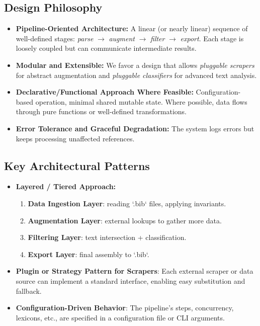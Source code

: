 \documentclass[12pt]{article}
\begin{document}
\subsection{Design Philosophy}
\begin{itemize}
  \item \textbf{Pipeline-Oriented Architecture:} A linear (or nearly linear) sequence of well-defined stages: \emph{parse} $\rightarrow$ \emph{augment} $\rightarrow$ \emph{filter} $\rightarrow$ \emph{export}. Each stage is loosely coupled but can communicate intermediate results.
  \item \textbf{Modular and Extensible:} We favor a design that allows \emph{pluggable scrapers} for abstract augmentation and \emph{pluggable classifiers} for advanced text analysis.
  \item \textbf{Declarative/Functional Approach Where Feasible:} Configuration-based operation, minimal shared mutable state. Where possible, data flows through pure functions or well-defined transformations. 
  \item \textbf{Error Tolerance and Graceful Degradation:} The system logs errors but keeps processing unaffected references. 
\end{itemize}

\subsection{Key Architectural Patterns}
\begin{itemize}
  \item \textbf{Layered / Tiered Approach:} 
  \begin{enumerate}
    \item \textbf{Data Ingestion Layer}: reading `.bib` files, applying invariants. 
    \item \textbf{Augmentation Layer}: external lookups to gather more data. 
    \item \textbf{Filtering Layer}: text intersection + classification. 
    \item \textbf{Export Layer}: final assembly to `.bib`.
  \end{enumerate}
  \item \textbf{Plugin or Strategy Pattern for Scrapers}: Each external scraper or data source can implement a standard interface, enabling easy substitution and fallback. 
  \item \textbf{Configuration-Driven Behavior}: The pipeline’s steps, concurrency, lexicons, etc., are specified in a configuration file or CLI arguments. 
\end{itemize}
\end{document}
